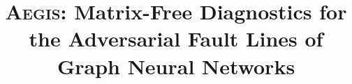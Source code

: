 \documentclass[conference]{IEEEtran}
\newcommand{\AEGIS}{\textsc{Aegis}\xspace}
\begin{document}
\title{\AEGIS: Matrix-Free Diagnostics for the Adversarial Fault Lines of Graph Neural Networks}

\author{}

\maketitle













\end{document}

